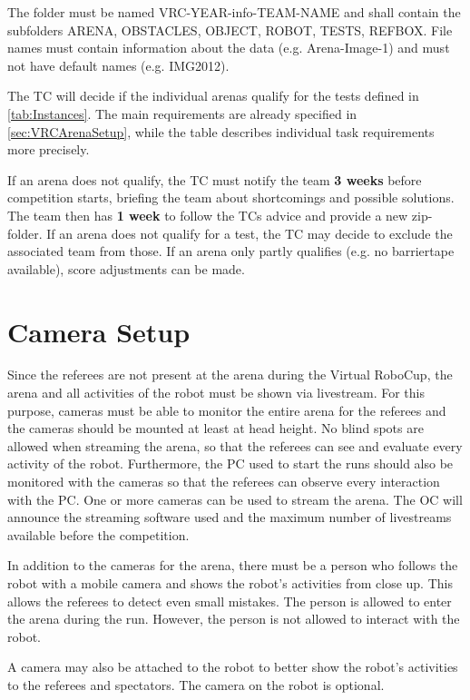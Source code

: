 The folder must be named VRC-YEAR-info-TEAM-NAME and shall contain the subfolders ARENA, OBSTACLES, OBJECT, ROBOT, TESTS, REFBOX. 
File names must contain information about the data (e.g. Arena-Image-1) and must not have default names (e.g. IMG2012).

The TC will decide if the individual arenas qualify for the tests defined in \ref{tab:Instances}. 
The main requirements are already specified in \ref{sec:VRCArenaSetup}, while the table describes individual task requirements more precisely.
 
If an arena does not qualify, the TC must notify the team \textbf{3 weeks} before competition starts, 
briefing the team about shortcomings and possible solutions. 
The team then has \textbf{1 week} to follow the TCs advice and provide a new zip-folder.
If an arena does not qualify for a test, the TC may decide to exclude the associated team from those.
If an arena only partly qualifies (e.g. no barriertape available), score adjustments can be made.


\section{Camera Setup} 
\label{sec:VRCCameraSetup}

Since the referees are not present at the arena during the Virtual RoboCup, the arena and all activities of the robot must be shown via livestream. For this purpose, cameras must be able to monitor the entire arena for the referees and the cameras should be mounted at least at head height. No blind spots are allowed when streaming the arena, so that the referees can see and evaluate every activity of the robot. Furthermore, the PC used to start the runs should also be monitored with the cameras so that the referees can observe every interaction with the PC. One or more cameras can be used to stream the arena. The OC will announce the streaming software used and the maximum number of livestreams available before the competition.
\par
In addition to the cameras for the arena, there must be a person who follows the robot with a mobile camera and shows the robot's activities from close up. This allows the referees to detect even small mistakes. The person is allowed to enter the arena during the run. However, the person is not allowed to interact with the robot.
\par
A camera may also be attached to the robot to better show the robot's activities to the referees and spectators. The camera on the robot is optional.

